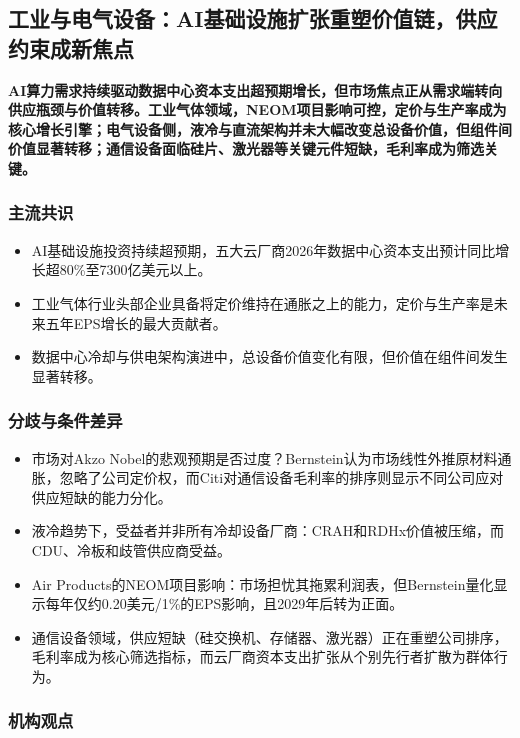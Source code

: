 \documentclass[11pt]{ctexart}
\begin{document}
\subsection{工业与电气设备：AI基础设施扩张重塑价值链，供应约束成新焦点}
\textbf{AI算力需求持续驱动数据中心资本支出超预期增长，但市场焦点正从需求端转向供应瓶颈与价值转移。工业气体领域，NEOM项目影响可控，定价与生产率成为核心增长引擎；电气设备侧，液冷与直流架构并未大幅改变总设备价值，但组件间价值显著转移；通信设备面临硅片、激光器等关键元件短缺，毛利率成为筛选关键。}
\subsubsection*{主流共识}
\begin{itemize}
  \item AI基础设施投资持续超预期，五大云厂商2026年数据中心资本支出预计同比增长超80\%至7300亿美元以上。
  \item 工业气体行业头部企业具备将定价维持在通胀之上的能力，定价与生产率是未来五年EPS增长的最大贡献者。
  \item 数据中心冷却与供电架构演进中，总设备价值变化有限，但价值在组件间发生显著转移。
\end{itemize}
\subsubsection*{分歧与条件差异}
\begin{itemize}
  \item 市场对Akzo Nobel的悲观预期是否过度？Bernstein认为市场线性外推原材料通胀，忽略了公司定价权，而Citi对通信设备毛利率的排序则显示不同公司应对供应短缺的能力分化。
  \item 液冷趋势下，受益者并非所有冷却设备厂商：CRAH和RDHx价值被压缩，而CDU、冷板和歧管供应商受益。
  \item Air Products的NEOM项目影响：市场担忧其拖累利润表，但Bernstein量化显示每年仅约0.20美元/1\%的EPS影响，且2029年后转为正面。
  \item 通信设备领域，供应短缺（硅交换机、存储器、激光器）正在重塑公司排序，毛利率成为核心筛选指标，而云厂商资本支出扩张从个别先行者扩散为群体行为。
\end{itemize}
\subsubsection*{机构观点}
\end{document}
